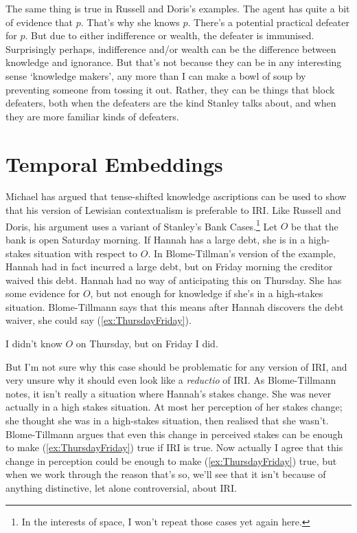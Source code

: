 \documentclass[oneside, a4paper]{book}
\renewcommand{\numbex}[2]{
\begin{enumerate*}
\setcounter{enumi}{\value{paper}}
\renewcommand{\labelenumi}{(\arabic{enumi})}
#2
\end{enumerate*}
\addtocounter{paper}{#1}}
\begin{document}
The same thing is true in Russell and Doris's examples. The agent has quite a bit of evidence that \(p\). That's why she knows \(p\). There's a potential practical defeater for \(p\). But due to either indifference or wealth, the defeater is immunised. Surprisingly perhaps, indifference and/or wealth can be the difference between knowledge and ignorance. But that's not because they can be in any interesting sense `knowledge makers', any more than I can make a bowl of soup by preventing someone from tossing it out. Rather, they can be things that block defeaters, both when the defeaters are the kind Stanley talks about, and when they are more familiar kinds of defeaters.

\section{Temporal Embeddings} \label{sect:time}

Michael \cite{MBT2009} has argued that tense-shifted knowledge ascriptions can be used to show that his version of Lewisian contextualism is preferable to IRI. Like Russell and Doris, his argument uses a variant of Stanley's Bank Cases.\footnote{In the interests of space, I won't repeat those cases yet again here.} Let \(O\) be that the bank is open Saturday morning. If Hannah has a large debt, she is in a high-stakes situation with respect to \(O\). In Blome-Tillman's version of the example, Hannah had in fact incurred a large debt, but on Friday morning the creditor waived this debt. Hannah had no way of anticipating this on Thursday. She has some evidence for \(O\), but not enough for knowledge if she's in a high-stakes situation. Blome-Tillmann says that this means after Hannah discovers the debt waiver, she could say (\ref{ex:ThursdayFriday}).

\numbex{1}{
\item \label{ex:ThursdayFriday} I didn't know \(O\) on Thursday, but on Friday I did.
}

\noindent But I'm not sure why this case should be problematic for any version of IRI, and very unsure why it should even look like a \textit{reductio} of IRI. As Blome-Tillmann notes, it isn't really a situation where Hannah's stakes change. She was never actually in a high stakes situation. At most her perception of her stakes change; she thought she was in a high-stakes situation, then realised that she wasn't. Blome-Tillmann argues that even this change in perceived stakes can be enough to make (\ref{ex:ThursdayFriday}) true if IRI is true. Now actually I agree that this change in perception could be enough to make (\ref{ex:ThursdayFriday}) true, but when we work through the reason that's so, we'll see that it isn't because of anything distinctive, let alone controversial, about IRI.
\end{document}
